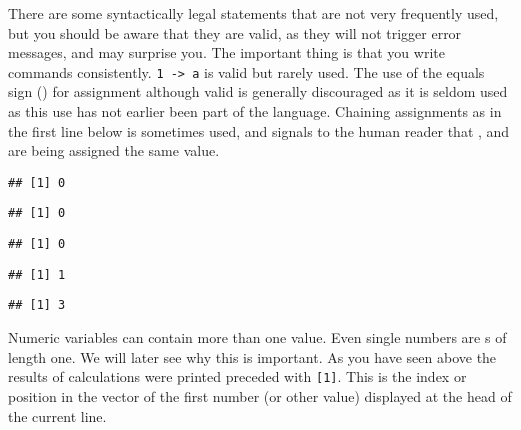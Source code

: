 \documentclass[paper=a4,10pt,div=17,headsepline,BCOR=12mm,twoside,open=right]{scrbook}\usepackage{knitr}
\begin{document}
There are some syntactically legal statements that are not very frequently used, but you should be aware that they are valid, as they will not trigger error messages, and may surprise you. The important thing is that you write commands consistently. \texttt{1 -> a} is valid but rarely used. The use of the equals sign (\code{=}) for assignment although valid is generally discouraged as it is seldom used as this use has not earlier been part of the \R language. Chaining assignments as in the first line below is sometimes used, and signals to the human reader that ,  and  are being assigned the same value.

\begin{knitrout}\footnotesize
{}\color{fgcolor}\begin{kframe}
\begin{alltt}
 \hlkwb{<-}  \hlkwb{<-}  \hlkwb{<-} 
\end{alltt}
\begin{verbatim}
## [1] 0
\end{verbatim}
\begin{alltt}
\end{alltt}
\begin{verbatim}
## [1] 0
\end{verbatim}
\begin{alltt}
\end{alltt}
\begin{verbatim}
## [1] 0
\end{verbatim}
\begin{alltt}
 \hlkwb{->} 
\end{alltt}
\begin{verbatim}
## [1] 1
\end{verbatim}
\begin{alltt}
 \hlkwb{=} 
\end{alltt}
\begin{verbatim}
## [1] 3
\end{verbatim}
\end{kframe}
\end{knitrout}

Numeric variables can contain more than one value. Even single numbers are s of length one. We will later see why this is important. As you have seen above the results of calculations were printed preceded with \texttt{[1]}. This is the index or position in the vector of the first number (or other value) displayed at the head of the current line.
\end{document}
